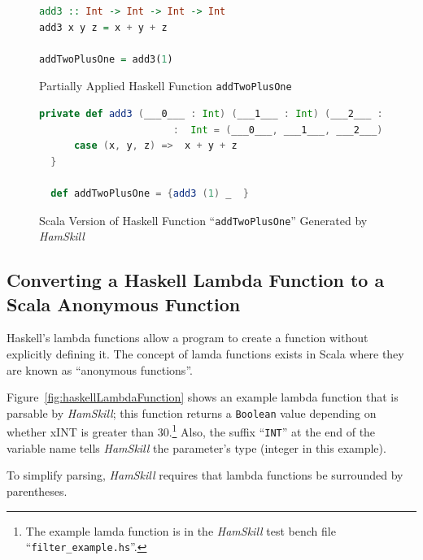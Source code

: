 \documentclass{report}
\begin{document}
\begin{figure}[H]
\begin{mdframed}
\begin{lstlisting}[language=Haskell]
add3 :: Int -> Int -> Int -> Int
add3 x y z = x + y + z

addTwoPlusOne = add3(1)
\end{lstlisting}
\end{mdframed}
\caption{Partially Applied Haskell Function \texttt{addTwoPlusOne}}\label{fig:haskellFunctionAddTwoPlusOne}
\end{figure}

\begin{figure}[H]
\begin{mdframed}
\begin{lstlisting}[language=Scala, basicstyle=\scriptsize]
  private def add3 (___0___ : Int) (___1___ : Int) (___2___ : Int) 
                       :  Int = (___0___, ___1___, ___2___) match {
      case (x, y, z) =>  x + y + z
  } 

  def addTwoPlusOne = {add3 (1) _  }
\end{lstlisting}
\end{mdframed}
\caption{Scala Version of Haskell Function ``\texttt{addTwoPlusOne}'' Generated by \textit{HamSkill}}\label{fig:scalaFunctionAddTwoPlusOne}
\end{figure}


\subsection{Converting a Haskell Lambda Function to a Scala Anonymous Function}\label{sec:lambdaAnonymousFunctions}

Haskell's lambda functions allow a program to create a function without explicitly defining it.  The concept of lamda functions exists in Scala where they are known as ``anonymous functions''.

Figure~\ref{fig:haskellLambdaFunction} shows an example lambda function that is parsable by \textit{HamSkill}; this function returns a \texttt{Boolean} value depending on whether xINT is greater than 30.\footnote{The example lamda function is in the \textit{HamSkill} test bench file ``\texttt{filter\_example.hs}''.}  Also, the suffix ``\texttt{INT}'' at the end of the variable name tells \textit{HamSkill} the parameter's type (integer in this example).

To simplify parsing, \textit{HamSkill} requires that lambda functions be surrounded by parentheses.
\end{document}
